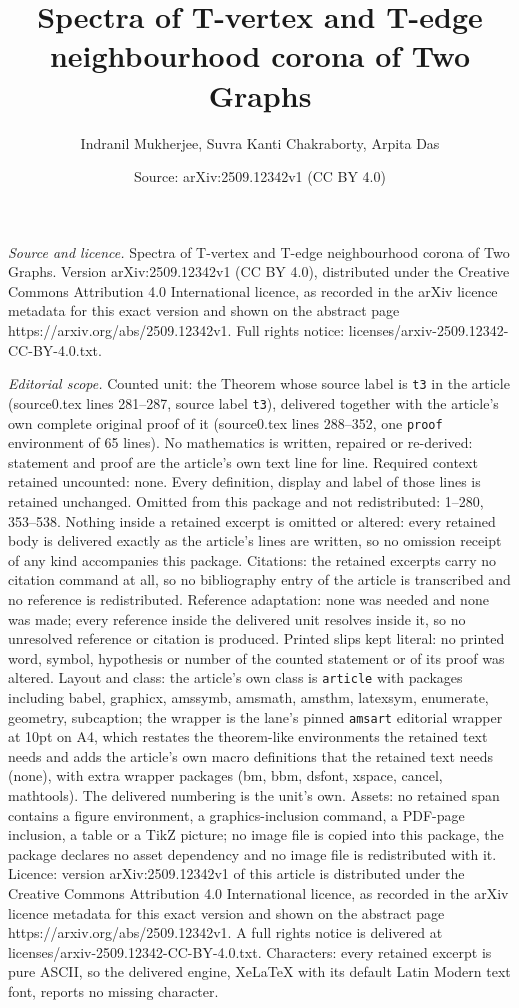 \documentclass[10pt,a4paper]{amsart}
\title[Spectra of T-vertex and T-edge neighbourhood corona of Two G]{Spectra of T-vertex and T-edge neighbourhood corona of Two Graphs}
\author{Indranil Mukherjee, Suvra Kanti Chakraborty, Arpita Das}
\date{Source: arXiv:2509.12342v1 (CC BY 4.0)}
\begin{document}
\maketitle

\noindent\emph{Source and licence.} Spectra of T-vertex and T-edge neighbourhood corona of Two Graphs. Version arXiv:2509.12342v1 (CC BY 4.0), distributed under the Creative Commons Attribution 4.0 International licence, as recorded in the arXiv licence metadata for this exact version and shown on the abstract page https://arxiv.org/abs/2509.12342v1. Full rights notice: licenses/arxiv-2509.12342-CC-BY-4.0.txt.\par\smallskip

\noindent\textit{Editorial scope.} Counted unit: the Theorem whose source label is \texttt{t3} in the article (source0.tex lines 281--287, source label \texttt{t3}), delivered together with the article's own complete original proof of it (source0.tex lines 288--352, one \texttt{proof} environment of 65 lines). No mathematics is written, repaired or re-derived: statement and proof are the article's own text line for line. Required context retained uncounted: none. Every definition, display and label of those lines is retained unchanged. Omitted from this package and not redistributed: 1--280, 353--538. Nothing inside a retained excerpt is omitted or altered: every retained body is delivered exactly as the article's lines are written, so no omission receipt of any kind accompanies this package. Citations: the retained excerpts carry no citation command at all, so no bibliography entry of the article is transcribed and no reference is redistributed. Reference adaptation: none was needed and none was made; every reference inside the delivered unit resolves inside it, so no unresolved reference or citation is produced. Printed slips kept literal: no printed word, symbol, hypothesis or number of the counted statement or of its proof was altered. Layout and class: the article's own class is \texttt{article} with packages including babel, graphicx, amssymb, amsmath, amsthm, latexsym, enumerate, geometry, subcaption; the wrapper is the lane's pinned \texttt{amsart} editorial wrapper at 10pt on A4, which restates the theorem-like environments the retained text needs and adds the article's own macro definitions that the retained text needs (none), with extra wrapper packages (bm, bbm, dsfont, xspace, cancel, mathtools). The delivered numbering is the unit's own. Assets: no retained span contains a figure environment, a graphics-inclusion command, a PDF-page inclusion, a table or a TikZ picture; no image file is copied into this package, the package declares no asset dependency and no image file is redistributed with it. Licence: version arXiv:2509.12342v1 of this article is distributed under the Creative Commons Attribution 4.0 International licence, as recorded in the arXiv licence metadata for this exact version and shown on the abstract page https://arxiv.org/abs/2509.12342v1. A full rights notice is delivered at licenses/arxiv-2509.12342-CC-BY-4.0.txt. Characters: every retained excerpt is pure ASCII, so the delivered engine, XeLaTeX with its default Latin Modern text font, reports no missing character.
\end{document}
